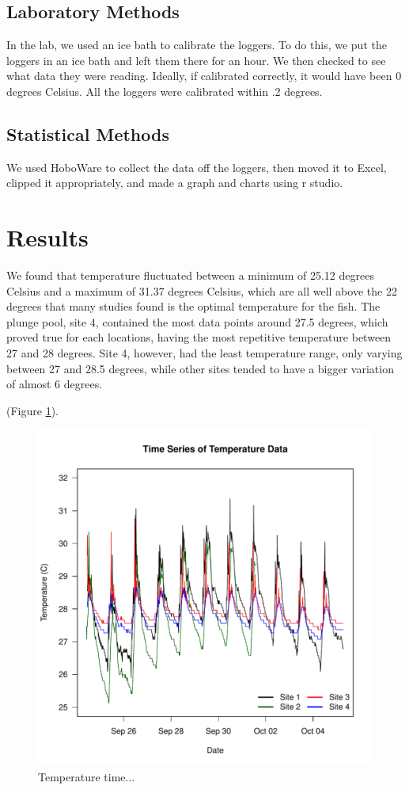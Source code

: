 \documentclass{article}
\begin{document}
\subsection{Laboratory Methods}

In the lab, we used an ice bath to calibrate the loggers. To do this, we put the loggers in an ice bath and left them there for an hour. We then checked to see what data they were reading. Ideally, if calibrated correctly, it would have been 0 degrees Celsius. All the loggers were calibrated within .2 degrees.

\subsection{Statistical Methods}

We used HoboWare to collect the data off the loggers, then moved it to Excel, clipped it appropriately, and made a graph and charts using r studio. 

\section{Results}

  We found that temperature fluctuated between a minimum of 25.12 degrees Celsius and a maximum of 31.37 degrees Celsius, which are all well above the 22 degrees that many studies found is the optimal temperature for the fish. The plunge pool, site 4, contained the most data points around 27.5 degrees, which proved true for each locations, having the most repetitive temperature between 27 and 28 degrees. Site 4, however, had the least temperature range, only varying between 27 and 28.5 degrees, while other sites tended to have a bigger variation of almost 6 degrees. 
  
(Figure \ref{Temp}).

\begin{figure}
\includegraphics{Figures/Temp}
\caption{Temperature time...}
\label{Temp}
\end{figure}
\end{document}

